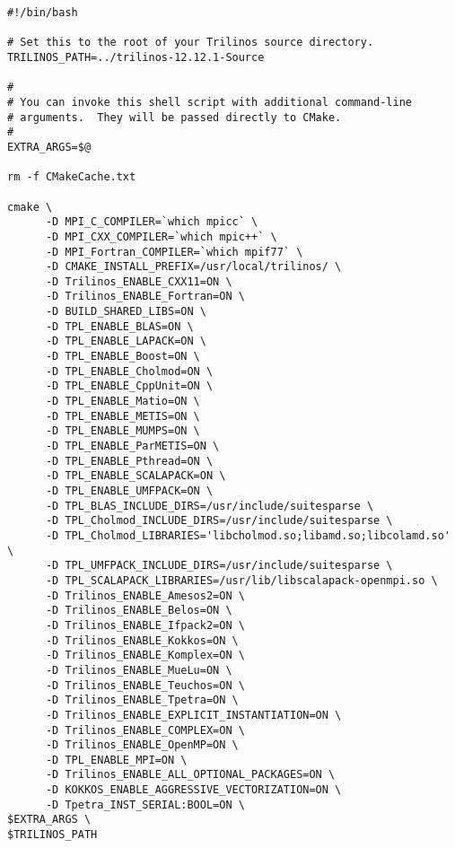 \begin{verbatim}
#!/bin/bash

# Set this to the root of your Trilinos source directory.
TRILINOS_PATH=../trilinos-12.12.1-Source

#
# You can invoke this shell script with additional command-line
# arguments.  They will be passed directly to CMake.
#
EXTRA_ARGS=$@

rm -f CMakeCache.txt

cmake \
      -D MPI_C_COMPILER=`which mpicc` \
      -D MPI_CXX_COMPILER=`which mpic++` \
      -D MPI_Fortran_COMPILER=`which mpif77` \
      -D CMAKE_INSTALL_PREFIX=/usr/local/trilinos/ \
      -D Trilinos_ENABLE_CXX11=ON \
      -D Trilinos_ENABLE_Fortran=ON \
      -D BUILD_SHARED_LIBS=ON \
      -D TPL_ENABLE_BLAS=ON \
      -D TPL_ENABLE_LAPACK=ON \
      -D TPL_ENABLE_Boost=ON \
      -D TPL_ENABLE_Cholmod=ON \
      -D TPL_ENABLE_CppUnit=ON \
      -D TPL_ENABLE_Matio=ON \
      -D TPL_ENABLE_METIS=ON \
      -D TPL_ENABLE_MUMPS=ON \
      -D TPL_ENABLE_ParMETIS=ON \
      -D TPL_ENABLE_Pthread=ON \
      -D TPL_ENABLE_SCALAPACK=ON \
      -D TPL_ENABLE_UMFPACK=ON \
      -D TPL_BLAS_INCLUDE_DIRS=/usr/include/suitesparse \
      -D TPL_Cholmod_INCLUDE_DIRS=/usr/include/suitesparse \
      -D TPL_Cholmod_LIBRARIES='libcholmod.so;libamd.so;libcolamd.so' \
      -D TPL_UMFPACK_INCLUDE_DIRS=/usr/include/suitesparse \
      -D TPL_SCALAPACK_LIBRARIES=/usr/lib/libscalapack-openmpi.so \
      -D Trilinos_ENABLE_Amesos2=ON \
      -D Trilinos_ENABLE_Belos=ON \
      -D Trilinos_ENABLE_Ifpack2=ON \
      -D Trilinos_ENABLE_Kokkos=ON \
      -D Trilinos_ENABLE_Komplex=ON \
      -D Trilinos_ENABLE_MueLu=ON \
      -D Trilinos_ENABLE_Teuchos=ON \
      -D Trilinos_ENABLE_Tpetra=ON \
      -D Trilinos_ENABLE_EXPLICIT_INSTANTIATION=ON \
      -D Trilinos_ENABLE_COMPLEX=ON \
      -D Trilinos_ENABLE_OpenMP=ON \
      -D TPL_ENABLE_MPI=ON \
      -D Trilinos_ENABLE_ALL_OPTIONAL_PACKAGES=ON \
      -D KOKKOS_ENABLE_AGGRESSIVE_VECTORIZATION=ON \
      -D Tpetra_INST_SERIAL:BOOL=ON \
$EXTRA_ARGS \
$TRILINOS_PATH
\end{verbatim}
